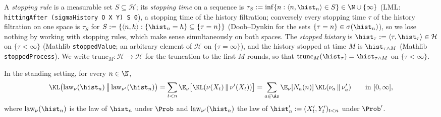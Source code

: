 A \emph{stopping rule} is a measurable set $S \subseteq \mathcal H$; its \emph{stopping time}
on a sequence is $\tau_S := \inf\{n : \langle n, \hist_n\rangle \in S\} \in \N \cup \{\infty\}$
(LML: \texttt{hittingAfter (sigmaHistory O X Y) S 0}), a stopping time of the history
filtration; conversely every stopping time $\tau$ of the history filtration on one space is
$\tau_S$ for $S := \{\langle n, h\rangle : \{\hist_n = h\} \subseteq \{\tau = n\}\}$ (Doob--Dynkin
for the sets $\{\tau = n\} \in \sigma(\hist_n)$), so we lose nothing by working with stopping
rules, which make sense simultaneously on both spaces. The \emph{stopped history} is
$\hist_\tau := \langle \tau, \hist_\tau\rangle \in \mathcal H$ on $\{\tau < \infty\}$ (Mathlib
\texttt{stoppedValue}; an arbitrary element of $\mathcal H$ on $\{\tau = \infty\}$), and the
history stopped at time $M$ is $\hist_{\tau \wedge M}$ (Mathlib \texttt{stoppedProcess}). We
write $\mathrm{trunc}_M : \mathcal H \to \mathcal H$ for the truncation to the first $M$ rounds,
so that $\mathrm{trunc}_M(\hist_\tau) = \hist_{\tau\wedge M}$ on $\{\tau < \infty\}$.

\begin{lemma}\label{lem:kl_history_le}
\leanok
In the standing setting, for every $n \in \N$,
\[
  \KL\big(\mathrm{law}_\nu(\hist_n)\,\big\|\,\mathrm{law}_{\nu'}(\hist_n)\big)
  = \sum_{t < n} \E_\nu\big[\KL(\nu(X_t)\,\|\,\nu'(X_t))\big]
  = \sum_{a \in \As} \E_\nu[N_a(n)]\,\KL(\nu_a \,\|\, \nu'_a) \qquad\text{in } [0, \infty],
\]
where $\mathrm{law}_\nu(\hist_n)$ is the law of $\hist_n$ under $\Prob$ and
$\mathrm{law}_{\nu'}(\hist_n)$ the law of $\hist'_n := (X'_t, Y'_t)_{t<n}$ under $\Prob'$.
\end{lemma}

